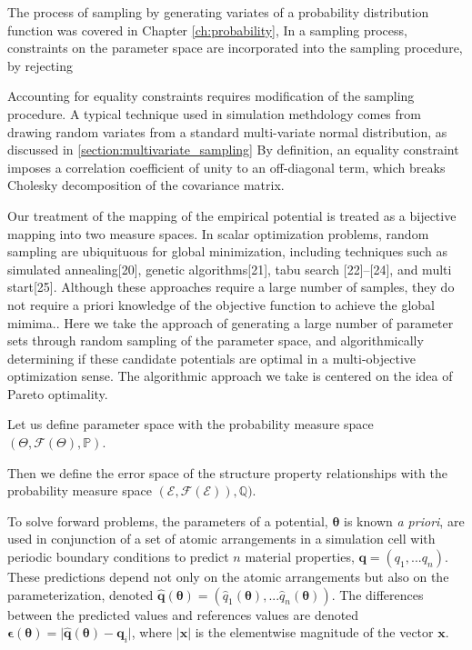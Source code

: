 The process of sampling by generating variates of a probability distribution function was covered in Chapter \ref{ch:probability},
In a sampling process, constraints on the parameter space are incorporated into the sampling procedure, by rejecting

Accounting for equality constraints requires modification of the sampling procedure.  A typical technique used in simulation methdology comes from drawing random variates from a standard multi-variate normal distribution, as discussed in \ref{section:multivariate_sampling}  By definition, an equality constraint imposes a correlation coefficient of unity to an off-diagonal term, which breaks Cholesky decomposition of the covariance matrix.

Our treatment of the mapping of the empirical potential is treated as a bijective mapping into two measure spaces.
In scalar optimization problems, random sampling are ubiquituous for global minimization, including techniques such as simulated annealing[20], genetic algorithms[21], tabu search [22]–[24], and multi start[25].  Although these approaches require a large number of samples, they do not require a priori knowledge of the objective function to achieve the global mimima..  Here we take the approach of generating a large number of parameter sets through random sampling of the parameter space, and algorithmically determining if these candidate potentials are optimal in a multi-objective optimization sense.  The algorithmic approach we take is centered on the idea of Pareto optimality.

Let us define parameter space with the probability measure space $(\Theta,\mathcal{F}(\Theta),\mathbb{P})$.

Then we define the error space of the structure property relationships with the probability measure space $(\mathcal{E},\mathcal{F}(\mathcal{E})),\mathbb{Q})$.

To solve forward problems, the parameters of a potential, $\bm{\theta}$ is known \emph{a priori}, are used in conjunction of a set of atomic arrangements in a simulation cell with periodic boundary conditions to predict $n$ material properties, $\bm{q} = (q_1,...q_n)$.  These predictions depend not only on the atomic arrangements but also on the parameterization, denoted
$\bm{\hat{q}}(\bm{\theta}) =
    (\hat{q}_1(\bm{\theta}),...\hat{q}_n(\bm{\theta}))$.
The differences between the predicted values and references values are denoted
$\bm{\epsilon}(\bm{\theta}) =
    \lvert \bm{\hat{q}}(\bm{\theta})
         - \bm{q}_i
    \rvert$,
where $|\bm{x}|$ is the elementwise magnitude of the vector $\bm{x}$.

